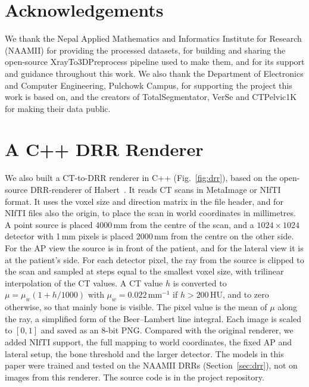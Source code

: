 \documentclass[11pt]{article}
\begin{document}
\section*{Acknowledgements}
We thank the Nepal Applied Mathematics and Informatics Institute for Research (NAAMII) for providing the processed datasets, for building and sharing the open-source XrayTo3DPreprocess pipeline used to make them, and for its support and guidance throughout this work. We also thank the Department of Electronics and Computer Engineering, Pulchowk Campus, for supporting the project this work is based on, and the creators of TotalSegmentator, VerSe and CTPelvic1K for making their data public.

\FloatBarrier



\appendix
\FloatBarrier
\section{A C++ DRR Renderer}\label{app:renderer}
We also built a CT-to-DRR renderer in C++ (Fig.~\ref{fig:drr}), based on the open-source DRR-renderer of Habert~\cite{habert2017drr}. It reads CT scans in MetaImage or NIfTI format. It uses the voxel size and direction matrix in the file header, and for NIfTI files also the origin, to place the scan in world coordinates in millimetres. A point source is placed 4000\,mm from the centre of the scan, and a $1024\times1024$ detector with 1\,mm pixels is placed 2000\,mm from the centre on the other side. For the AP view the source is in front of the patient, and for the lateral view it is at the patient's side. For each detector pixel, the ray from the source is clipped to the scan and sampled at steps equal to the smallest voxel size, with trilinear interpolation of the CT values. A CT value $h$ is converted to $\mu=\mu_w(1+h/1000)$ with $\mu_w=0.022\,\mathrm{mm}^{-1}$ if $h>200$\,HU, and to zero otherwise, so that mainly bone is visible. The pixel value is the mean of $\mu$ along the ray, a simplified form of the Beer--Lambert line integral. Each image is scaled to $[0,1]$ and saved as an 8-bit PNG. Compared with the original renderer, we added NIfTI support, the full mapping to world coordinates, the fixed AP and lateral setup, the bone threshold and the larger detector. The models in this paper were trained and tested on the NAAMII DRRs (Section~\ref{sec:drr}), not on images from this renderer. The source code is in the project repository.
\end{document}
